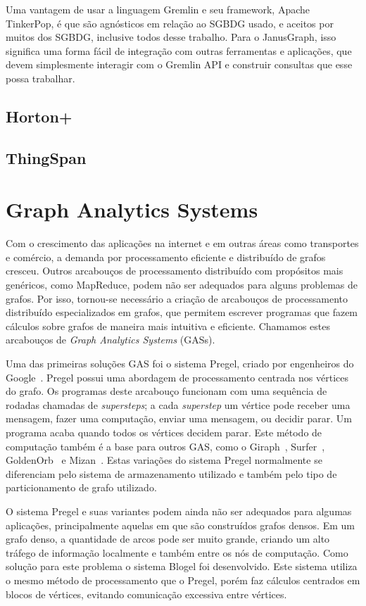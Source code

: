 \documentclass[conference]{IEEEtran}
\begin{document}
Uma vantagem de usar a linguagem Gremlin e seu framework, Apache TinkerPop, é que são agnósticos em relação ao SGBDG usado, e aceitos por muitos dos SGBDG, inclusive todos desse trabalho. Para o JanusGraph, isso significa uma forma fácil de integração com outras ferramentas e aplicações, que devem simplesmente interagir com o Gremlin API e construir consultas que esse possa trabalhar.

\subsection{Horton+}
\cite{horton}

\subsection{ThingSpan}
\cite{thingspan}

\section{Graph Analytics Systems}
Com o crescimento das aplicações na internet e em outras áreas como
transportes e comércio, a demanda por processamento eficiente e
distribuído de grafos cresceu. Outros arcabouços de processamento
distribuído com propósitos mais genéricos, como MapReduce, podem não ser
adequados para alguns problemas de grafos. Por isso, tornou-se
necessário a criação de arcabouços de processamento distribuído
especializados em grafos, que permitem escrever programas que fazem
cálculos sobre grafos de maneira mais intuitiva e eficiente. Chamamos
estes arcabouços de {\em Graph Analytics Systems} (GASs).

Uma das primeiras soluções GAS foi o sistema Pregel, criado por
engenheiros do Google~\cite{pregel}. Pregel possui uma abordagem de
processamento centrada nos vértices do grafo. Os programas deste
arcabouço funcionam com uma sequência de rodadas chamadas de {\em
supersteps}; a cada {\em superstep} um vértice pode receber uma
mensagem, fazer uma computação, enviar uma mensagem, ou decidir parar.
Um programa acaba quando todos os vértices decidem parar. Este método de
computação também é a base para outros GAS, como o Giraph~\cite{giraph},
Surfer~\cite{surfer}, GoldenOrb~\cite{goldenorb} e Mizan~\cite{mizan}.
Estas variações do sistema Pregel normalmente se diferenciam pelo
sistema de armazenamento utilizado e também pelo tipo de particionamento
de grafo utilizado.

O sistema Pregel e suas variantes podem ainda não ser adequados para
algumas aplicações, principalmente aquelas em que são construídos grafos
densos. Em um grafo denso, a quantidade de arcos pode ser muito grande,
criando um alto tráfego de informação localmente e também entre os nós
de computação. Como solução para este problema o sistema Blogel foi
desenvolvido. Este sistema utiliza o mesmo método de processamento que o
Pregel, porém faz cálculos centrados em blocos de vértices, evitando
comunicação excessiva entre vértices.
\end{document}
